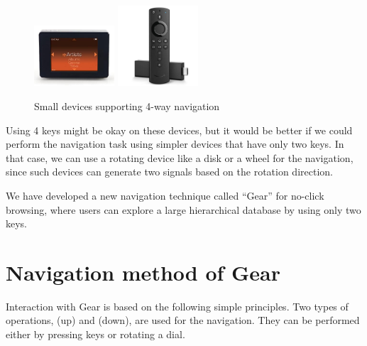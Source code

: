 \documentclass[conference]{IEEEtran}
\def\up{\tsf{▲}}
\def\down{\tsf{▼}}
\begin{document}
\begin{figure}[H]
\centerline{
  \includegraphics[width=30mm,bb=0 0 333 250]{figures/0048a5e91ddcf1d5670bd958e3c55619.jpg}
  \includegraphics[width=30mm,bb=0 0 551 551]{figures/70c036b24525c6cace9955b24152e97e.jpg}
  }
\caption{Small devices supporting 4-way navigation}
\label{rio}
\end{figure}

Using 4 keys might be okay on these devices, but it would be better
if we could perform the navigation task using simpler devices that have only two keys.
In that case, we can use a rotating device like a disk or a wheel for the navigation,
since such devices can generate two signals based on the rotation direction.

We have developed a new navigation technique called ``{Gear}'' for no-click browsing,
where users can explore a large hierarchical database by using only two keys.


\section{Navigation method of Gear}
\label{navigation}

Interaction with Gear is based on the following simple principles.
Two types of operations,
{\up} (up) and {\down} (down), are used for the navigation.
They can be performed either by pressing keys or rotating a dial.
\end{document}
